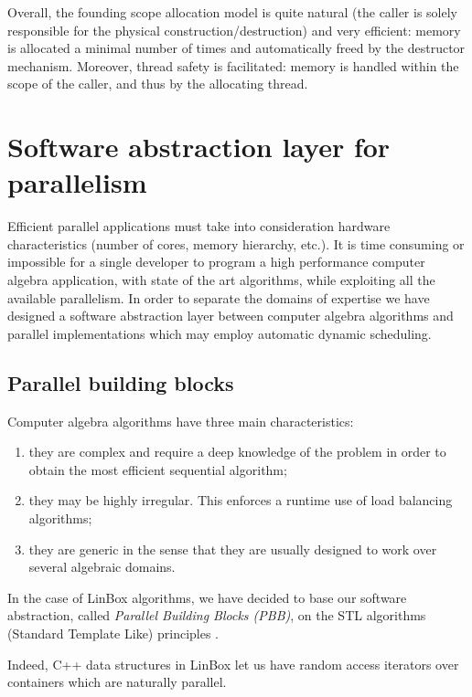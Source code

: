 \documentclass{article}
\newcommand{\linbox}{{\sc LinBox}\xspace}
\begin{document}


Overall, the founding scope allocation model is quite natural (the caller is
solely responsible for the physical construction/destruction) and very
efficient: memory is allocated a minimal number of times and
automatically freed by the destructor mechanism. Moreover, thread
safety is facilitated: memory is handled within the scope of the
caller, and thus by the allocating thread. 

\section{Software abstraction layer for parallelism}\label{sec:pbb}

Efficient parallel applications must take into consideration hardware
characteristics (number of cores, memory hierarchy, etc.). It is time
consuming or impossible for a single developer to 
program a high performance computer algebra application, with state of
the art algorithms, while exploiting all the available parallelism.  
In order to separate the domains of expertise we have designed a
software abstraction layer between computer algebra algorithms
and parallel implementations which may employ automatic dynamic scheduling.

\subsection{Parallel building blocks}\label{ssec:parallel}
Computer algebra algorithms have three main characteristics:
\begin{enumerate}
\item
they are complex and require a deep knowledge of the problem in
  order to obtain the most efficient sequential algorithm;
\item
they may be highly irregular. This enforces a runtime use of
  load balancing algorithms;
\item
they are generic in the sense that they are usually designed
  to work over several algebraic domains.
\end{enumerate}

  In the case of \linbox algorithms, we have decided to base our
  software abstraction, called {\em Parallel Building Blocks (PBB)},
  on the STL algorithms (Standard Template Like) principles
  \cite{Musser:1996:STL}.

  Indeed, C++ data structures in \linbox let us have random access
  iterators over containers which are naturally parallel. 
 
\end{document}
